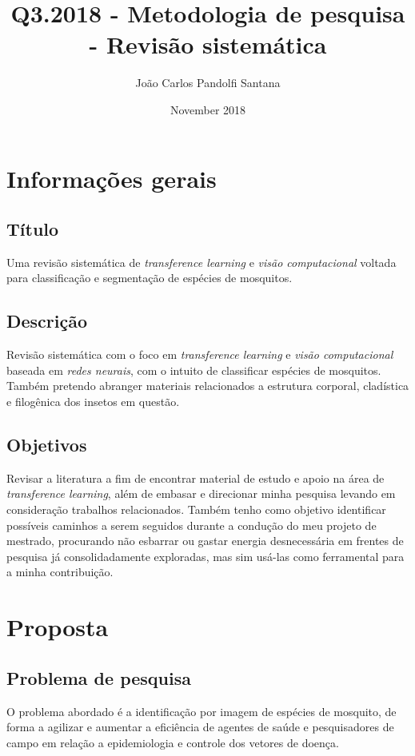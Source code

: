 \documentclass{article}
\title{Q3.2018 - Metodologia de pesquisa - Revisão sistemática}
\author{João Carlos Pandolfi Santana }
\date{November 2018}
\begin{document}
\maketitle

\section{Informações gerais}
\subsection{Título}
Uma revisão sistemática de \emph{transference learning} e \emph{visão computacional} voltada para classificação e segmentação de espécies de mosquitos.

\subsection{Descrição}
Revisão sistemática com o foco em \emph{transference learning} e \emph{visão computacional} baseada em \emph{redes neurais}, com o intuito de classificar espécies de mosquitos. Também pretendo abranger materiais relacionados a estrutura corporal, cladística e filogênica dos insetos em questão.

\subsection{Objetivos}
Revisar a literatura a fim de encontrar material de estudo e apoio na área de \emph{transference learning}, além de embasar e direcionar minha pesquisa levando em consideração trabalhos relacionados. Também tenho como objetivo identificar possíveis caminhos a serem seguidos durante a condução do meu projeto de mestrado, procurando não esbarrar ou gastar energia desnecessária em frentes de pesquisa já consolidadamente exploradas, mas sim usá-las como ferramental para a minha contribuição.


\section{Proposta} 
\subsection{Problema de pesquisa}
O problema abordado é a identificação por imagem de espécies de mosquito, de forma a agilizar e aumentar a eficiência de agentes de saúde e pesquisadores de campo em relação a epidemiologia e controle dos vetores de doença.
\end{document}
